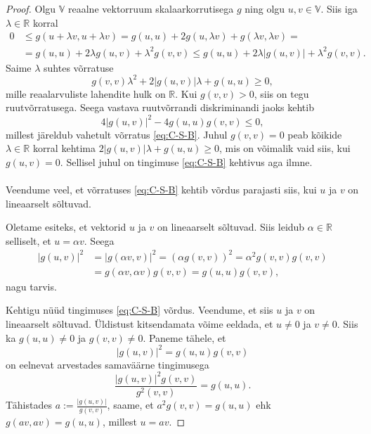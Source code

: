 \documentclass[12pt,a4paper,oneside]{article}
\theoremstyle{plain}
\theoremstyle{definition}
\numberwithin{equation}{section}
\def\R{{\mathbb R}}
\def\V{{\mathbb V}}
\begin{document}
\begin{proof}
Olgu $\V$ reaalne vektorruum skalaarkorrutisega $g$ ning olgu 
$u, v \in \V$. Siis iga $\lambda \in \R$ korral
\begin{align*}
0 &\leq g\left(u+\lambda v,u+\lambda v\right) = 
g\left(u,u\right) + 2g\left(u, \lambda v \right) + 
g\left(\lambda v, \lambda v\right) = \\
&= g\left(u,u\right) + 2\lambda g\left(u, v \right) + 
\lambda^2 g\left(v,v\right) \leq g\left(u,u\right) + 
2\lambda | g\left(u, v \right)| + \lambda^2 g\left(v,v\right).
\end{align*}
Saime $\lambda$ suhtes võrratuse
\begin{equation*}
g\left(v,v\right)\lambda^2 + 2|g\left(u, v \right)|\lambda + 
g\left(u,u\right) \geq 0,
\end{equation*}
mille reaalarvuliste lahendite hulk on $\R$. Kui 
$g\left(v,v\right) > 0$, siis on tegu ruut\-võrratusega. 
Seega vastava ruutvõrrandi 
diskriminandi jaoks kehtib
\begin{equation*}
4|g\left(u,v\right)|^2 - 4g\left(u,u\right)g\left(v,v\right) \leq 0,
\end{equation*}
millest järeldub vahetult võrratus \ref{eq:C-S-B}. Juhul 
$g\left(v,v\right) = 0$ peab kõikide $\lambda \in \R$ korral kehtima 
$2|g\left(u,v\right)|\lambda + g\left(u,u\right) \geq 0$, mis on 
võimalik vaid siis, kui $g\left(u,v\right) = 0$. Sellisel juhul on 
tingimuse \ref{eq:C-S-B} kehtivus aga ilmne.
\paragraph{}
Veendume veel, et võrratuses \ref{eq:C-S-B} kehtib võrdus parajasti 
siis, kui $u$ ja $v$ on lineaarselt sõltuvad.

Oletame esiteks, et vektorid $u$ ja $v$ on lineaarselt sõltuvad. 
Siis leidub $\alpha \in \R$ selliselt, et $u = \alpha v$. Seega
\begin{align*}
|g\left(u,v\right)|^2 &= |g\left(\alpha v,v\right)|^2 = 
\left(\alpha g\left(v,v\right)\right)^2 = 
\alpha^2 g \left(v,v\right) g \left(v,v\right) \\
&= g \left(\alpha v,\alpha v\right)g \left( v,v\right) = 
g \left(u,u\right)g \left(v,v\right),
\end{align*}
nagu tarvis.

Kehtigu nüüd tingimuses \ref{eq:C-S-B} võrdus. Veendume, et siis 
$u$ ja $v$ on lineaarselt sõltuvad. Üldistust kitsendamata võime 
eeldada, et $u \neq 0$ ja $v \neq 0$. Siis ka 
$g \left(u,u\right) \neq 0$ ja $g \left(v,v\right) \neq 0$. 
Paneme tähele, et
\[|g \left(u, v \right)|^2 = g \left(u, u \right) g \left(v, v \right)\]
on eelnevat arvestades samaväärne tingimusega
\[\frac{|g \left(u, v \right)|^2 g \left(v, v \right)}
{g^2 \left(v, v \right) } = g \left(u, u \right). \]
Tähistades $a := \frac{|g \left(u, v \right)| }{g \left(v, v \right) }$, 
saame, et $a^2 g \left(v, v \right) = g \left(u, u \right)$ 
ehk $g \left(av, av \right) = g \left(u, u \right)$, millest $u = av$.
\end{proof}
\end{document}

